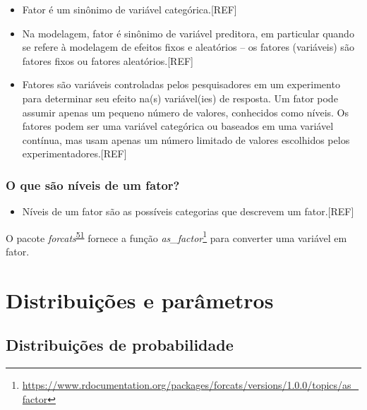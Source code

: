 \documentclass[
]{book}
\providecommand{\tightlist}{%
  \setlength{\itemsep}{0pt}\setlength{\parskip}{0pt}}
\renewcommand{\href}[2]{#2\footnote{\url{#1}}}
\newenvironment{infobox}[1]
  {
  \begin{itemize}
  \renewcommand{\labelitemi}{
    \raisebox{-.7\height}[0pt][0pt]{
      {\setkeys{Gin}{width=3em,keepaspectratio}
        \texttt{[image: \#1]}}
    }
  }
  \setlength{\fboxsep}{1em}
  \begin{blackbox}
  \item
  }
  {
  \end{blackbox}
  \end{itemize}
  }
\begin{document}
\begin{itemize}
\item
  Fator é um sinônimo de variável categórica.{[}REF{]}
\item
  Na modelagem, fator é sinônimo de variável preditora, em particular quando se refere à modelagem de efeitos fixos e aleatórios -- os fatores (variáveis) são fatores fixos ou fatores aleatórios.{[}REF{]}
\item
  Fatores são variáveis controladas pelos pesquisadores em um experimento para determinar seu efeito na(s) variável(ies) de resposta. Um fator pode assumir apenas um pequeno número de valores, conhecidos como níveis. Os fatores podem ser uma variável categórica ou baseados em uma variável contínua, mas usam apenas um número limitado de valores escolhidos pelos experimentadores.{[}REF{]}
\end{itemize}

\hypertarget{o-que-suxe3o-nuxedveis-de-um-fator}{%
\subsection{O que são níveis de um fator?}\label{o-que-suxe3o-nuxedveis-de-um-fator}}

\begin{itemize}
\tightlist
\item
  Níveis de um fator são as possíveis categorias que descrevem um fator.{[}REF{]}
\end{itemize}

\begin{infobox}{images/Rlogo}
O pacote \emph{forcats}\textsuperscript{\protect\hyperlink{ref-forcats}{51}} fornece a função \href{https://www.rdocumentation.org/packages/forcats/versions/1.0.0/topics/as_factor}{\emph{as\_factor}} para converter uma variável em fator.

\end{infobox}

\hypertarget{distribuicoes-parametros}{%
\chapter{\texorpdfstring{\textbf{Distribuições e parâmetros}}{Distribuições e parâmetros}}\label{distribuicoes-parametros}}

\hypertarget{distribuicoes}{%
\section{Distribuições de probabilidade}\label{distribuicoes}}
\end{document}
